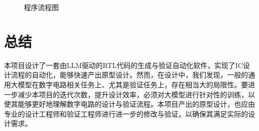 \documentclass[UTF8]{ctexart}
\begin{document}
\begin{figure}[H]
    \centering
    
    \caption{程序流程图}
    \label{fig:flowchart}
\end{figure}




\section{总结}
本项目设计了一套由LLM驱动的RTL代码的生成与验证自动化软件，实现了IC设计流程的自动化，能够快速产出原型设计。然而，在设计中，我们发现，一般的通用大模型在数字电路相关任务上、尤其是验证任务上，存在相当大的局限性。要进一步减少本项目的迭代次数，提升设计效率，必须对大模型进行针对性的训练，以使其能够更好地理解数字电路的设计与验证流程。本项目产出的原型设计，也应由专业的设计工程师和验证工程师进行进一步的修改与验证，以确保其满足实际的设计需求。
\end{document}
